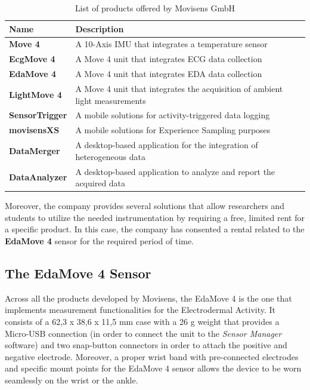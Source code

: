 \begin{table}[H]
\centering
\begin{tabular}{ll}
    \hline
    Name                     &  Description \\
    \hline
    \textbf{Move 4}          & A 10-Axis IMU that integrates a temperature sensor \\
    \textbf{EcgMove 4}       & A Move 4 unit that integrates ECG data collection  \\
    \textbf{EdaMove 4}       & A Move 4 unit that integrates EDA data collection \\
    \textbf{LightMove 4}     & A Move 4 unit that integrates the acquisition of ambient light measurements \\
    \textbf{SensorTrigger}   & A mobile solutions for activity-triggered data logging \\
    \textbf{movisensXS}      & A mobile solutions for Experience Sampling purposes \\
    \textbf{DataMerger}      & A desktop-based application for the integration of heterogeneous data \\
    \textbf{DataAnalyzer}    & A desktop-based application to analyze and report the acquired data \\
    \hline
\end{tabular}
\caption{List of products offered by Movisens GmbH}
\label{toc:movisens-products}
\end{table}

Moreover, the company provides several solutions that allow researchers and students to utilize the needed instrumentation by requiring a free, limited rent for a specific product. In this case, the company has consented a rental related to the \textbf{EdaMove 4} sensor for the required period of time. 

\subsection{The EdaMove 4 Sensor}\label{subsec:edamove4}

Across all the products developed by Movisens, the EdaMove 4 is the one that implements measurement functionalities for the Electrodermal Activity. It consists of a 62,3 x 38,6 x 11,5 mm case with a 26 g weight \cite{edamove4} that provides a Micro-USB connection (in order to connect the unit to the \textit{Sensor Manager} software) and two snap-button connectors in order to attach the positive and negative electrode. Moreover, a proper wrist band with pre-connected electrodes and specific mount points for the EdaMove 4 sensor allows the device to be worn seamlessly on the wrist or the ankle.


